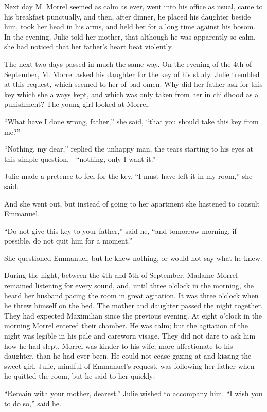 Next day M. Morrel seemed as calm as ever, went into his office as
usual, came to his breakfast punctually, and then, after dinner, he
placed his daughter beside him, took her head in his arms, and held her
for a long time against his bosom. In the evening, Julie told her
mother, that although he was apparently so calm, she had noticed that
her father’s heart beat violently.

The next two days passed in much the same way. On the evening of the
4th of September, M. Morrel asked his daughter for the key of his
study. Julie trembled at this request, which seemed to her of bad omen.
Why did her father ask for this key which she always kept, and which
was only taken from her in childhood as a punishment? The young girl
looked at Morrel.

“What have I done wrong, father,” she said, “that you should take this
key from me?”

“Nothing, my dear,” replied the unhappy man, the tears starting to his
eyes at this simple question,—“nothing, only I want it.”

Julie made a pretence to feel for the key. “I must have left it in my
room,” she said.

And she went out, but instead of going to her apartment she hastened to
consult Emmanuel.

“Do not give this key to your father,” said he, “and tomorrow morning,
if possible, do not quit him for a moment.”

She questioned Emmanuel, but he knew nothing, or would not say what he
knew.

During the night, between the 4th and 5th of September, Madame Morrel
remained listening for every sound, and, until three o’clock in the
morning, she heard her husband pacing the room in great agitation. It
was three o’clock when he threw himself on the bed. The mother and
daughter passed the night together. They had expected Maximilian since
the previous evening. At eight o’clock in the morning Morrel entered
their chamber. He was calm; but the agitation of the night was legible
in his pale and careworn visage. They did not dare to ask him how he
had slept. Morrel was kinder to his wife, more affectionate to his
daughter, than he had ever been. He could not cease gazing at and
kissing the sweet girl. Julie, mindful of Emmanuel’s request, was
following her father when he quitted the room, but he said to her
quickly:

“Remain with your mother, dearest.” Julie wished to accompany him. “I
wish you to do so,” said he.

